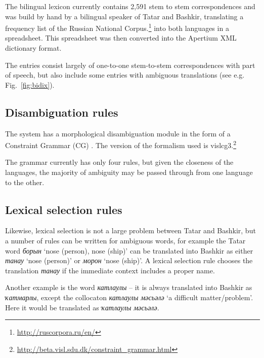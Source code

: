 \documentclass[11pt,a4paper]{article}
\begin{document}
The bilingual lexicon currently contains 2,591 stem to stem correspondences and was build by hand by a bilingual 
speaker of Tatar and Bashkir, translating a frequency list of the Russian National Corpus.\footnote{\url{http://ruscorpora.ru/en/}}
into both languages in a spreadsheet. This spreadsheet was then converted into the Apertium
XML dictionary format. 

The entries consist largely of one-to-one stem-to-stem correspondences with part of speech, but also
include some entries with ambiguous translations (see e.g. Fig.~\ref{fig:bidix}).

\subsection{Disambiguation rules}

The system has a morphological disambiguation module in the form of a 
Constraint Grammar (CG) \cite{karlsson95}. The version of the formalism used is 
vislcg3.\footnote{\url{http://beta.visl.sdu.dk/constraint_grammar.html}}

The grammar currently has only four rules, but given the closeness of the languages, the 
majority of ambiguity may be passed through from one language to the other.

\subsection{Lexical selection rules}

Likewise, lexical selection is not a large problem between Tatar and Bashkir, but a 
number of rules can be written for ambiguous words, for example the Tatar 
word \emph{борын} `nose (person), nose (ship)' can be translated into Bashkir 
as either \emph{танау} `nose (person)' or \emph{морон} `nose (ship)'. A lexical selection
rule chooses the translation \emph{танау} if the immediate context includes a proper 
name.

Another example is the word \emph{катлаулы} -- it is always translated into Bashkir 
as \emph{ҡатмарлы}, except the collocaton \emph{катлаулы мәсьәлә} `a difficult matter/problem'. Here 
it would be translated as \emph{ҡатлаулы мәсьәлә}.

\end{document}
